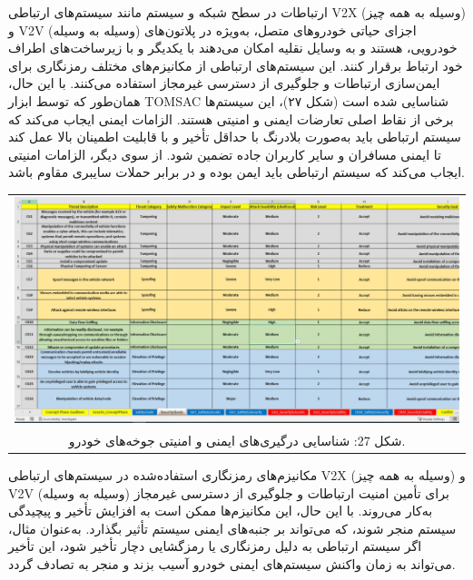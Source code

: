\documentclass[a4paper,10pt]{article}
\begin{document}
            ارتباطات در سطح شبکه و سیستم مانند سیستم‌های ارتباطی V2X (وسیله به همه چیز) و V2V (وسیله به وسیله) اجزای حیاتی خودروهای متصل، به‌ویژه در پلاتون‌های خودرویی، هستند و به وسایل نقلیه امکان می‌دهند با یکدیگر و با زیرساخت‌های اطراف خود ارتباط برقرار کنند. این سیستم‌های ارتباطی از مکانیزم‌های مختلف رمزنگاری برای ایمن‌سازی ارتباطات و جلوگیری از دسترسی غیرمجاز استفاده می‌کنند. با این حال، همان‌طور که توسط ابزار TOMSAC شناسایی شده است (شکل ۲۷)، این سیستم‌ها برخی از نقاط اصلی تعارضات ایمنی و امنیتی هستند. الزامات ایمنی ایجاب می‌کند که سیستم ارتباطی باید به‌صورت بلادرنگ با حداقل تأخیر و با قابلیت اطمینان بالا عمل کند تا ایمنی مسافران و سایر کاربران جاده تضمین شود. از سوی دیگر، الزامات امنیتی ایجاب می‌کند که سیستم ارتباطی باید ایمن بوده و در برابر حملات سایبری مقاوم باشد.

            \begin{table}
            
                \centering
                \begin{tabular}{ c }
                    
                    \includegraphics[width=1\textwidth]{Image/fig27.jpg} \\

                    شکل 27: شناسایی درگیری‌های ایمنی و امنیتی جوخه‌های خودرو.

                \end{tabular}
    
            \end{table}

            مکانیزم‌های رمزنگاری استفاده‌شده در سیستم‌های ارتباطی V2X (وسیله به همه چیز) و V2V (وسیله به وسیله) برای تأمین امنیت ارتباطات و جلوگیری از دسترسی غیرمجاز به‌کار می‌روند. با این حال، این مکانیزم‌ها ممکن است به افزایش تأخیر و پیچیدگی سیستم منجر شوند، که می‌تواند بر جنبه‌های ایمنی سیستم تأثیر بگذارد. به‌عنوان مثال، اگر سیستم ارتباطی به دلیل رمزنگاری یا رمزگشایی دچار تأخیر شود، این تأخیر می‌تواند به زمان واکنش سیستم‌های ایمنی خودرو آسیب بزند و منجر به تصادف گردد.
\end{document}
